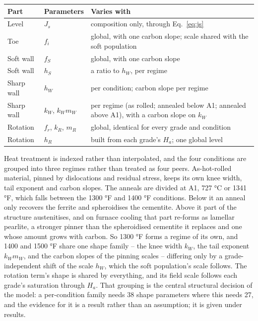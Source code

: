 \documentclass[
  11pt,
]{article}
\newcounter{none} %
\begin{document}
{\def\LTcaptype{none} %
\begin{longtable}[]{@{}
  >{\raggedright\arraybackslash}p{}
  >{\raggedright\arraybackslash}p{}
  >{\raggedright\arraybackslash}p{}@{}}
\toprule\noalign{}
\begin{minipage}[b]{\linewidth}\raggedright
Part
\end{minipage} & \begin{minipage}[b]{\linewidth}\raggedright
Parameters
\end{minipage} & \begin{minipage}[b]{\linewidth}\raggedright
Varies with
\end{minipage} \\
\midrule\noalign{}
\endhead
\bottomrule\noalign{}
\endlastfoot
Level & \(J_s\) & composition only, through Eq.~\eqref{eq:js} \\
Toe & \(f_i\) & global, with one carbon slope; scale shared with the soft population \\
Soft wall & \(f_S\) & global, with one carbon slope \\
Soft wall & \(h_S\) & a ratio to \(h_W\), per regime \\
Sharp wall & \(h_W\) & per condition; carbon slope per regime \\
Sharp wall & \(k_W\), \(k_W m_W\) & per regime (as rolled; annealed below A1; annealed above A1), with a carbon slope on \(k_W\) \\
Rotation & \(f_r\), \(k_R\), \(m_R\) & global, identical for every grade and condition \\
Rotation & \(h_R\) & built from each grade's \(H_a\); one global level \\
\end{longtable}
}

Heat treatment is indexed rather than interpolated, and the four conditions are grouped into three regimes rather than treated as four peers. As-hot-rolled material, pinned by dislocations and residual stress, keeps its own knee width, tail exponent and carbon slopes. The anneals are divided at A1, 727 °C or 1341 °F, which falls between the 1300 °F and 1400 °F conditions. Below it an anneal only recovers the ferrite and spheroidises the cementite. Above it part of the structure austenitises, and on furnace cooling that part re-forms as lamellar pearlite, a stronger pinner than the spheroidised cementite it replaces and one whose amount grows with carbon. So 1300 °F forms a regime of its own, and 1400 and 1500 °F share one shape family -- the knee width \(k_W\), the tail exponent \(k_W m_W\), and the carbon slopes of the pinning scales -- differing only by a grade-independent shift of the scale \(h_W\), which the soft population's scale follows. The rotation term's shape is shared by everything, and its field scale follows each grade's saturation through \(H_a\). That grouping is the central structural decision of the model: a per-condition family needs 38 shape parameters where this needs 27, and the evidence for it is a result rather than an assumption; it is given under results.
\end{document}
